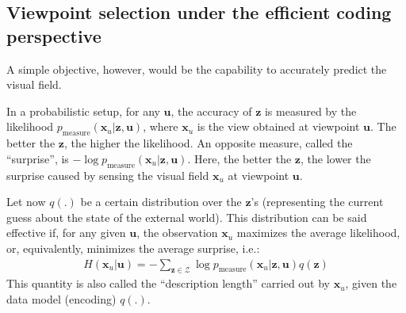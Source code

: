\documentclass{article}
\begin{document}







\subsection{Viewpoint selection under the efficient coding perspective}

A simple objective, however, would be the capability to accurately predict the {\color{blue} visual field}. 

In a probabilistic setup, for any $\boldsymbol{u}$, the accuracy of $\boldsymbol{z}$ is measured by the likelihood $p_\text{measure}(\boldsymbol{x}_u|\boldsymbol{z}, \boldsymbol{u})$, where $\boldsymbol{x}_u$ is the view obtained at {\color{blue} viewpoint} $\boldsymbol{u}$. The better the $\boldsymbol{z}$, the higher the likelihood.
An opposite measure, called the ``surprise'', is $-\log p_\text{measure}(\boldsymbol{x}_u|\boldsymbol{z}, \boldsymbol{u})$. 
Here, the better the $\boldsymbol{z}$, the lower the surprise caused by sensing the {\color{blue} visual field} $\boldsymbol{x}_u$ at {\color{blue} viewpoint} $\boldsymbol{u}$.


Let now $q(.)$ be a certain distribution over the $\boldsymbol{z}$'s (representing the current guess about the state of the external world). This distribution can be said effective if, for any given $\boldsymbol{u}$, the observation $\boldsymbol{x}_u$ maximizes the average likelihood, or, equivalently, minimizes the average surprise, i.e.:
\begin{align}
H(\boldsymbol{x}_u| \boldsymbol{u})=-\sum_{\boldsymbol{z}\in\mathcal{Z}}\log p_\text{measure}(\boldsymbol{x}_u|\boldsymbol{z}, \boldsymbol{u}) q(\boldsymbol{z})
\end{align}  
This quantity is also called the ``description length'' \cite{hinton1994autoencoders} carried out by $\boldsymbol{x}_u$, given the data model (encoding) $q(.)$.
\end{document}
